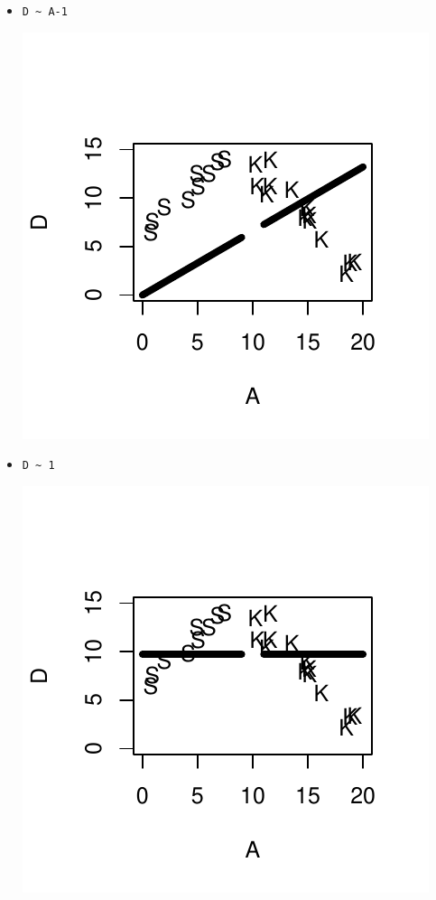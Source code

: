 \begin{itemize}
\item \verb=D ~ A-1=
   
\begin{AnswerText}
\includegraphics{Figures/fig-fig-4-3-q3}
\end{AnswerText}


 \item \verb-D ~ 1-
   

\begin{AnswerText}
\includegraphics{Figures/fig-fig-4-3-q4}
\end{AnswerText}
   

\end{itemize}
